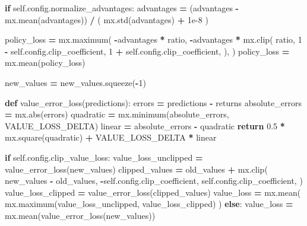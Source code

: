 \documentclass[
  chinese,
  11pt,
  letterpaper,
]{article}
\newenvironment{Shaded}{\begin{snugshade}}{\end{snugshade}}
\newcommand{\BuiltInTok}[1]{#1}
\newcommand{\ControlFlowTok}[1]{\textcolor[rgb]{0.13,0.29,0.53}{\textbf{#1}}}
\newcommand{\DecValTok}[1]{\textcolor[rgb]{0.00,0.00,0.81}{#1}}
\newcommand{\FloatTok}[1]{\textcolor[rgb]{0.00,0.00,0.81}{#1}}
\newcommand{\KeywordTok}[1]{\textcolor[rgb]{0.13,0.29,0.53}{\textbf{#1}}}
\newcommand{\NormalTok}[1]{#1}
\newcommand{\OperatorTok}[1]{\textcolor[rgb]{0.81,0.36,0.00}{\textbf{#1}}}
\newcommand{\VariableTok}[1]{\textcolor[rgb]{0.00,0.00,0.00}{#1}}
\renewenvironment{Shaded}{\par\smallskip}{\par\smallskip}
\begin{document}
\begin{Shaded}
\begin{Highlighting}[]
        \ControlFlowTok{if} \VariableTok{self}\NormalTok{.config.normalize\_advantages:}
\NormalTok{            advantages }\OperatorTok{=}\NormalTok{ (advantages }\OperatorTok{{-}}\NormalTok{ mx.mean(advantages)) }\OperatorTok{/}\NormalTok{ (}
\NormalTok{                mx.std(advantages) }\OperatorTok{+} \FloatTok{1e{-}8}
\NormalTok{            )}

\NormalTok{        policy\_loss }\OperatorTok{=}\NormalTok{ mx.maximum(}
            \OperatorTok{{-}}\NormalTok{advantages }\OperatorTok{*}\NormalTok{ ratio,}
            \OperatorTok{{-}}\NormalTok{advantages}
            \OperatorTok{*}\NormalTok{ mx.clip(}
\NormalTok{                ratio,}
                \DecValTok{1} \OperatorTok{{-}} \VariableTok{self}\NormalTok{.config.clip\_coefficient,}
                \DecValTok{1} \OperatorTok{+} \VariableTok{self}\NormalTok{.config.clip\_coefficient,}
\NormalTok{            ),}
\NormalTok{        )}
\NormalTok{        policy\_loss }\OperatorTok{=}\NormalTok{ mx.mean(policy\_loss)}

\NormalTok{        new\_values }\OperatorTok{=}\NormalTok{ new\_values.squeeze(}\OperatorTok{{-}}\DecValTok{1}\NormalTok{)}

        \KeywordTok{def}\NormalTok{ value\_error\_loss(predictions):}
\NormalTok{            errors }\OperatorTok{=}\NormalTok{ predictions }\OperatorTok{{-}}\NormalTok{ returns}
\NormalTok{            absolute\_errors }\OperatorTok{=}\NormalTok{ mx.}\BuiltInTok{abs}\NormalTok{(errors)}
\NormalTok{            quadratic }\OperatorTok{=}\NormalTok{ mx.minimum(absolute\_errors, VALUE\_LOSS\_DELTA)}
\NormalTok{            linear }\OperatorTok{=}\NormalTok{ absolute\_errors }\OperatorTok{{-}}\NormalTok{ quadratic}
            \ControlFlowTok{return} \FloatTok{0.5} \OperatorTok{*}\NormalTok{ mx.square(quadratic) }\OperatorTok{+}\NormalTok{ VALUE\_LOSS\_DELTA }\OperatorTok{*}\NormalTok{ linear}

        \ControlFlowTok{if} \VariableTok{self}\NormalTok{.config.clip\_value\_loss:}
\NormalTok{            value\_loss\_unclipped }\OperatorTok{=}\NormalTok{ value\_error\_loss(new\_values)}
\NormalTok{            clipped\_values }\OperatorTok{=}\NormalTok{ old\_values }\OperatorTok{+}\NormalTok{ mx.clip(}
\NormalTok{                new\_values }\OperatorTok{{-}}\NormalTok{ old\_values,}
                \OperatorTok{{-}}\VariableTok{self}\NormalTok{.config.clip\_coefficient,}
                \VariableTok{self}\NormalTok{.config.clip\_coefficient,}
\NormalTok{            )}
\NormalTok{            value\_loss\_clipped }\OperatorTok{=}\NormalTok{ value\_error\_loss(clipped\_values)}
\NormalTok{            value\_loss }\OperatorTok{=}\NormalTok{ mx.mean(}
\NormalTok{                mx.maximum(value\_loss\_unclipped, value\_loss\_clipped)}
\NormalTok{            )}
        \ControlFlowTok{else}\NormalTok{:}
\NormalTok{            value\_loss }\OperatorTok{=}\NormalTok{ mx.mean(value\_error\_loss(new\_values))}


\end{Highlighting}
\end{Shaded}
\end{document}
